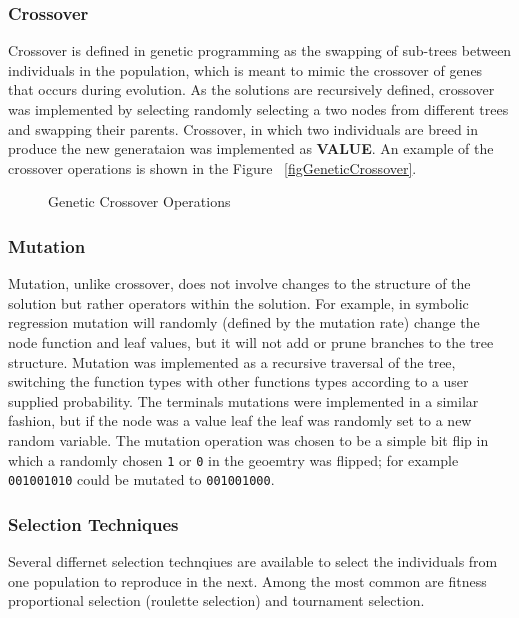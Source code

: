 \subsubsection{Crossover}

Crossover is defined in genetic programming as the swapping of sub-trees
between individuals in the population, which is meant to mimic the
crossover of genes that occurs during evolution. As the solutions
are recursively defined, crossover was implemented by selecting randomly
selecting a two nodes from different trees and swapping their parents.
Crossover, in which two individuals are breed in produce the new generataion was implemented as \textbf{VALUE}.
An example of the crossover operations is shown in the Figure ~\ref{figGeneticCrossover}.
\begin{figure}
    \caption[Genetic Crossover Operations]{Genetic Crossover Operations}
    \label{fig:GeneticCrossover}
\end{figure}


\subsubsection{Mutation}

Mutation, unlike crossover, does not involve changes to the structure
of the solution but rather operators within the solution. For example,
in symbolic regression mutation will randomly (defined by the mutation
rate) change the node function and leaf values, but it will not add
or prune branches to the tree structure. Mutation was implemented
as a recursive traversal of the tree, switching the function types
with other functions types according to a user supplied probability.
The terminals mutations were implemented in a similar fashion, but
if the node was a value leaf the leaf was randomly set to a new random
variable. 
The mutation operation was chosen to be a simple bit flip in which a randomly chosen \verb+1+ or \verb+0+ in the geoemtry was flipped; for example \verb+001001010+ could be mutated to \verb+001001000+.
\subsubsection{Selection Techniques}
Several differnet selection technqiues are available to select the individuals from one population to reproduce in the next.
Among the most common are fitness proportional selection (roulette selection) and tournament selection.

